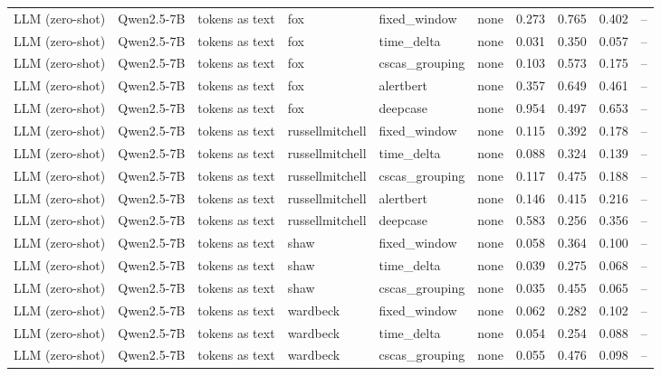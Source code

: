 \begin{longtable}{llllllcccc}
\addlinespace
LLM (zero-shot) & Qwen2.5-7B & tokens as text & fox & fixed\_window & none & 0.273 & 0.765 & 0.402 & -- \\
\addlinespace
LLM (zero-shot) & Qwen2.5-7B & tokens as text & fox & time\_delta & none & 0.031 & 0.350 & 0.057 & -- \\
\addlinespace
LLM (zero-shot) & Qwen2.5-7B & tokens as text & fox & cscas\_grouping & none & 0.103 & 0.573 & 0.175 & -- \\
\addlinespace
LLM (zero-shot) & Qwen2.5-7B & tokens as text & fox & alertbert & none & 0.357 & 0.649 & 0.461 & -- \\
\addlinespace
LLM (zero-shot) & Qwen2.5-7B & tokens as text & fox & deepcase & none & 0.954 & 0.497 & 0.653 & -- \\
\addlinespace
LLM (zero-shot) & Qwen2.5-7B & tokens as text & russellmitchell & fixed\_window & none & 0.115 & 0.392 & 0.178 & -- \\
\addlinespace
LLM (zero-shot) & Qwen2.5-7B & tokens as text & russellmitchell & time\_delta & none & 0.088 & 0.324 & 0.139 & -- \\
\addlinespace
LLM (zero-shot) & Qwen2.5-7B & tokens as text & russellmitchell & cscas\_grouping & none & 0.117 & 0.475 & 0.188 & -- \\
\addlinespace
LLM (zero-shot) & Qwen2.5-7B & tokens as text & russellmitchell & alertbert & none & 0.146 & 0.415 & 0.216 & -- \\
\addlinespace
LLM (zero-shot) & Qwen2.5-7B & tokens as text & russellmitchell & deepcase & none & 0.583 & 0.256 & 0.356 & -- \\
\addlinespace
LLM (zero-shot) & Qwen2.5-7B & tokens as text & shaw & fixed\_window & none & 0.058 & 0.364 & 0.100 & -- \\
\addlinespace
LLM (zero-shot) & Qwen2.5-7B & tokens as text & shaw & time\_delta & none & 0.039 & 0.275 & 0.068 & -- \\
\addlinespace
LLM (zero-shot) & Qwen2.5-7B & tokens as text & shaw & cscas\_grouping & none & 0.035 & 0.455 & 0.065 & -- \\
\addlinespace
LLM (zero-shot) & Qwen2.5-7B & tokens as text & wardbeck & fixed\_window & none & 0.062 & 0.282 & 0.102 & -- \\
\addlinespace
LLM (zero-shot) & Qwen2.5-7B & tokens as text & wardbeck & time\_delta & none & 0.054 & 0.254 & 0.088 & -- \\
\addlinespace
LLM (zero-shot) & Qwen2.5-7B & tokens as text & wardbeck & cscas\_grouping & none & 0.055 & 0.476 & 0.098 & -- \\

\end{longtable}
